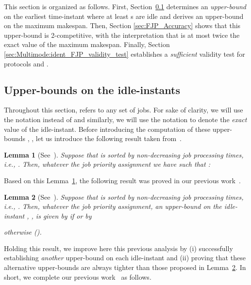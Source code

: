 \documentclass{article}
\newtheorem{validity test}{Validity Test}
\newtheorem{Lemma}{Lemma}
\begin{document}
This section is organized as follows. First, Section~\ref{sec:Multimode:ident_FJP_upper_bounds} determines an \emph{upper-bound}  on the earliest time-instant where at least  s are idle and derives an upper-bound  on the maximum makespan. Then, Section \ref{sec:FJP_Accuracy} shows that this upper-bound  is 2-competitive, with the interpretation that  is at most twice the exact value of the maximum makespan. Finally, Section \ref{sec:Multimode:ident_FJP_validity_test} establishes a \emph{sufficient} validity test for protocols  and . 

\subsection{Upper-bounds  on the idle-instants}
\label{sec:Multimode:ident_FJP_upper_bounds}

Throughout this section,  refers to any set of  jobs. For sake of clarity, we will use the notation  instead of  and similarly, we will use the notation  to denote the \emph{exact} value of the  idle-instant. Before introducing the computation of these upper-bounds , , let us introduce the following result taken from~\cite{NelisGoossensAndersson:09}. 

\begin{Lemma}[See~\cite{NelisGoossensAndersson:09}]
\label{lem:Multimode:ident_FJP_lem1}
Suppose that  is sorted by non-decreasing job processing times, i.e., . Then, whatever the job priority assignment we have  such that :

\end{Lemma} 

Based on this Lemma~\ref{lem:Multimode:ident_FJP_lem1}, the following result was proved in our previous work~\cite{NelisGoossensAndersson:09}. 

\begin{Lemma}[See~\cite{NelisGoossensAndersson:09}]
\label{lem:Multimode:ident_FJP_maxidle_old}
Suppose that  is sorted by non-decreasing job processing times, i.e., . Then, whatever the job priority assignment, an upper-bound  on the idle-instant , , is given by  if  or by

\begin{small}

\end{small}
otherwise ().
\end{Lemma} 

Holding this result, we improve here this previous analysis by (i) successfully establishing \emph{another} upper-bound  on each idle-instant  and (ii) proving that these alternative upper-bounds are always tighter than those proposed in Lemma~\ref{lem:Multimode:ident_FJP_maxidle_old}. In short, we complete our previous work~\cite{NelisGoossensAndersson:09} as follows.
\end{document}
